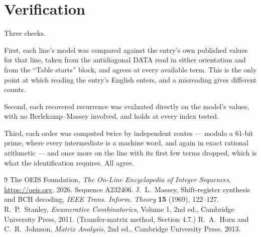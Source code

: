 \documentclass[11pt,a4paper]{article}
\theoremstyle{plain}
\theoremstyle{definition}
\begin{document}
\section{Verification}

Three checks.

First, each line's model was compared against the entry's own published values for that line,
taken from the antidiagonal DATA read in either orientation and from the ``Table starts''
block, and agrees at every available term. This is the only point at which reading the entry's
English enters, and a misreading gives different counts.

Second, each recovered recurrence was evaluated directly on the model's values, with no
Berlekamp--Massey involved, and holds at every index tested.

Third, each order was computed twice by independent routes --- modulo a $61$-bit prime, where
every intermediate is a machine word, and again in exact rational arithmetic --- and once more
on the line with its first few terms dropped, which is what the identification requires. All
agree.

\begin{thebibliography}{9}
 The OEIS Foundation, \emph{The On-Line Encyclopedia of Integer
Sequences}, \url{https://oeis.org}, 2026. Sequence A232406.
 J.~L.~Massey, Shift-register synthesis and BCH decoding, \emph{IEEE
Trans. Inform. Theory} \textbf{15} (1969), 122--127.
 R.~P.~Stanley, \emph{Enumerative Combinatorics}, Volume 1, 2nd ed.,
Cambridge University Press, 2011. (Transfer-matrix method, Section 4.7.)
 R.~A.~Horn and C.~R.~Johnson, \emph{Matrix Analysis}, 2nd ed., Cambridge
University Press, 2013.
\end{thebibliography}
\end{document}
